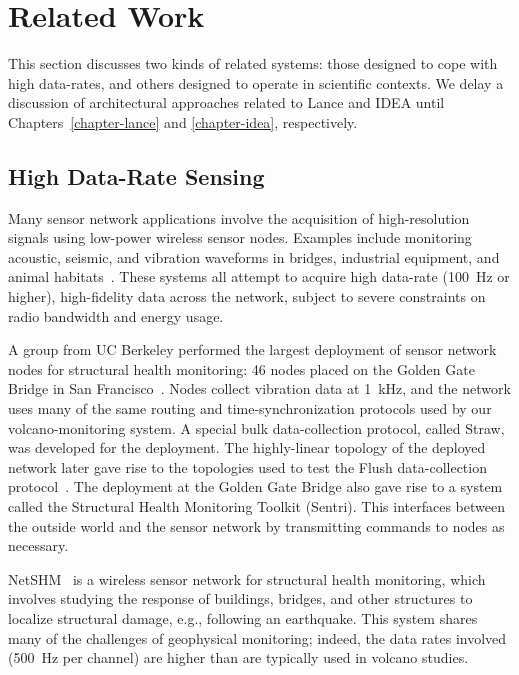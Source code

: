 \section{Related Work}
\label{sec-relatedwork}

This section discusses two kinds of related systems: those designed to cope
with high data-rates, and others designed to operate in scientific contexts.
We delay a discussion of architectural approaches related to Lance and IDEA
until Chapters~\ref{chapter-lance} and \ref{chapter-idea}, respectively.

\subsection{High Data-Rate Sensing}

Many sensor network applications involve the acquisition of high-resolution
signals using low-power wireless sensor nodes. Examples include monitoring
acoustic, seismic, and vibration waveforms in bridges, industrial equipment,
and animal habitats~\cite{girod-ipsn07,enviromic}. These systems all attempt
to acquire high data-rate (100~Hz or higher), high-fidelity data across the
network, subject to severe constraints on radio bandwidth and energy usage.

A group from UC Berkeley performed the largest deployment of sensor network
nodes for structural health monitoring: 46 nodes placed on the Golden Gate
Bridge in San Francisco~\cite{ggb-ipsn07}. Nodes collect vibration data at
1~kHz, and the network uses many of the same routing and time-synchronization
protocols used by our volcano-monitoring system. A special bulk
data-collection protocol, called Straw, was developed for the deployment. The
highly-linear topology of the deployed network later gave rise to the
topologies used to test the Flush data-collection
protocol~\cite{flush-sensys07}. The deployment at the Golden Gate Bridge also
gave rise to a system called the Structural Health Monitoring Toolkit
(Sentri). This interfaces between the outside world and the sensor network by
transmitting commands to nodes as necessary.

NetSHM~\cite{netshm-ewsnsubmission,netshm-emnets05,wisan} is a wireless
sensor network for structural health monitoring, which involves studying the
response of buildings, bridges, and other structures to localize structural
damage, e.g., following an earthquake. This system shares many of the
challenges of geophysical monitoring; indeed, the data rates involved (500~Hz
per channel) are higher than are typically used in volcano studies. 

